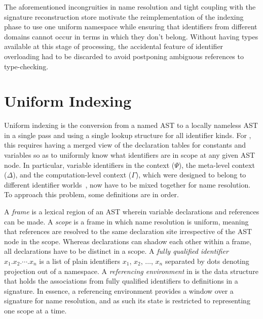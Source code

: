 
The aforementioned incongruities in name resolution and tight coupling with the signature reconstruction store motivate the reimplementation of the indexing phase to use one uniform namespace while ensuring that identifiers from different domains cannot occur in terms in which they don't belong.
Without having types available at this stage of processing, the accidental feature of identifier overloading had to be discarded to avoid postponing ambiguous references to type-checking.

\section{Uniform Indexing}\label{section:indexing}


Uniform indexing is the conversion from a named \ac{AST} to a locally nameless \ac{AST} in a single pass and using a single lookup structure for all identifier kinds.
For \Beluga, this requires having a merged view of the declaration tables for constants and variables so as to uniformly know what identifiers are in scope at any given \ac{AST} node.
In particular, variable identifiers in the \LF context ($\Psi$), the meta-level context ($\Delta$), and the computation-level context ($\Gamma$), which were designed to belong to different identifier worlds~\cite{ferreira2012compiler}, now have to be mixed together for name resolution.
To approach this problem, some definitions are in order.



A \textit{frame} is a lexical region of an \ac{AST} wherein variable declarations and references can be made.
A \textit{scope} is a frame in which name resolution is uniform, meaning that references are resolved to the same declaration site irrespective of the \ac{AST} node in the scope.
Whereas declarations can shadow each other within a frame, all declarations have to be distinct in a scope.
A \textit{fully qualified identifier} $x_1.x_2.\cdots.x_n$ is a list of plain identifiers $x_1$, $x_2$, $\dots$, $x_n$ separated by dots denoting projection out of a namespace.
A \textit{referencing environment} in \Beluga is the data structure that holds the associations from fully qualified identifiers to definitions in a signature.
In essence, a referencing environment provides a window over a signature for name resolution, and as such its state is restricted to representing one scope at a time.

